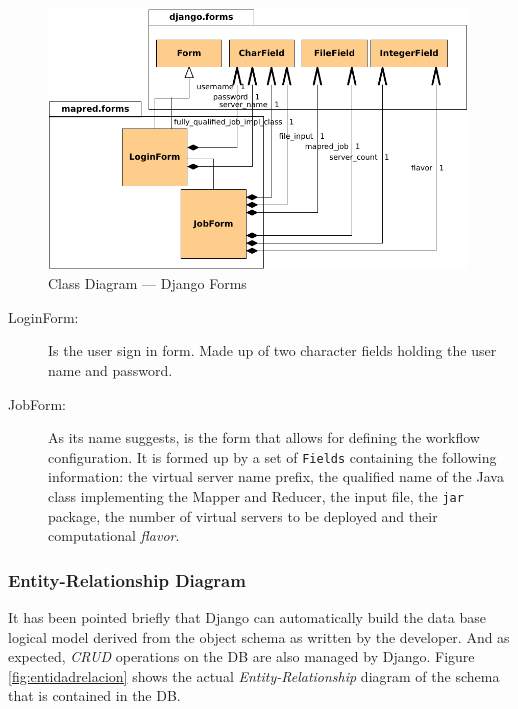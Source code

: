 \begin{figure}[tbp]
\begin{center}
\includegraphics[width=0.99\textwidth]{imagenes/031.pdf}
 \caption{Class Diagram --- Django Forms}
\label{fig:clasesformulariosdjango}
\end{center}
\end{figure}

\begin{description}
 \item[LoginForm:] Is the user sign in form. Made up of two character fields holding the user name and password.
 \item[JobForm:] As its name suggests, is the form that allows for defining the workflow configuration. It is formed up by a set of \texttt{Fields} containing the following information: the virtual server name prefix, the qualified name of the Java class implementing the Mapper and Reducer, the input file, the \texttt{jar} package, the number of virtual servers to be deployed and their computational \emph{flavor}.
\end{description}


\subsubsection{Entity-Relationship Diagram}\label{subsubsec:entidadrelacion}
\noindent It has been pointed briefly that Django can automatically build the data base logical model derived from the object schema as written by the developer. And as expected, \emph{CRUD} operations on the DB are also managed by Django. Figure \ref{fig:entidadrelacion} shows the actual \emph{Entity-Relationship} diagram of the schema that is contained in the DB.

